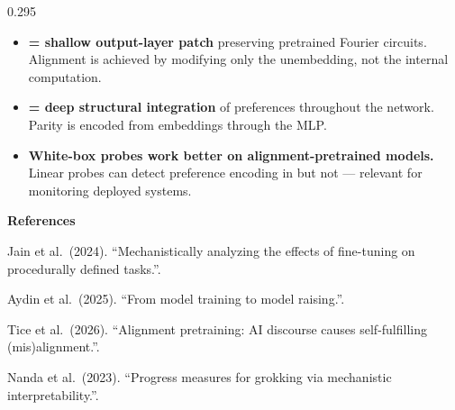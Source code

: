 \documentclass[final]{beamer}
\newcommand{\POST}{\cPOST}
\newcommand{\PTG}{\cPTG}
\begin{document}
\begin{frame}[t]{}
\begin{columns}[T]
\begin{column}{0.295\textwidth}
\vspace{18pt}

\vspace{2pt}
\begin{takeawaybox}
\posterbody
\begin{itemize}[leftmargin=*, itemsep=6pt]
  \item \textbf{\POST{} = shallow output-layer patch} preserving pretrained Fourier circuits. Alignment is achieved by modifying only the unembedding, not the internal computation.
  \item \textbf{\PTG{} = deep structural integration} of preferences throughout the network. Parity is encoded from embeddings through the MLP.
  \item \textbf{White-box probes work better on alignment-pretrained models.} Linear probes can detect preference encoding in \PTG{} but not \POST{} --- relevant for monitoring deployed systems.
\end{itemize}
\end{takeawaybox}

\vspace{12pt}

{\posterref
\textbf{References}\\[3pt]
\begin{enumerate}[leftmargin=*, itemsep=1pt, label={[\arabic*]}]
  \item Jain et al.\ (2024). ``Mechanistically analyzing the effects of fine-tuning on procedurally defined tasks.''.
  \item Aydin et al.\ (2025). ``From model training to model raising.''.
  \item Tice et al.\ (2026). ``Alignment pretraining: AI discourse causes self-fulfilling (mis)alignment.''.
  \item Nanda et al.\ (2023). ``Progress measures for grokking via mechanistic interpretability.''.
\end{enumerate}
}

\end{column}

\end{columns}

\end{frame}
\end{document}
